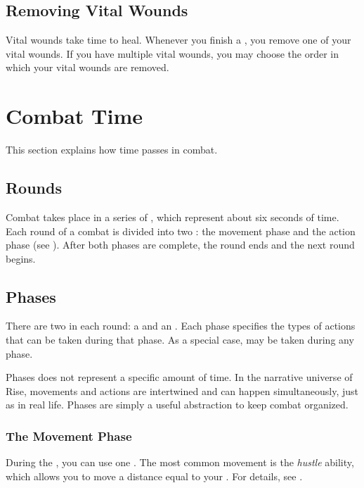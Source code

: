   \subsection{Removing Vital Wounds}\label{Removing Vital Wounds}
    Vital wounds take time to heal.
    Whenever you finish a , you remove one of your vital wounds.
    If you have multiple vital wounds, you may choose the order in which your vital wounds are removed.

\section{Combat Time}\label{Combat Time}
  This section explains how time passes in combat.

  \subsection{Rounds}\label{Rounds}

    Combat takes place in a series of , which represent about six seconds of time.
    Each round of a combat is divided into two : the movement phase and the action phase (see ).
    After both phases are complete, the round ends and the next round begins.

  \subsection{Phases}\label{Phases}

    There are two  in each round: a  and an .
    Each phase specifies the types of actions that can be taken during that phase.
    As a special case,  may be taken during any phase.

    Phases does not represent a specific amount of time.
    In the narrative universe of Rise, movements and actions are intertwined and can happen simultaneously, just as in real life.
    Phases are simply a useful abstraction to keep combat organized.

    \subsubsection{The Movement Phase}\label{The Movement Phase}
      During the , you can use one .
      The most common movement is the \textit{hustle} ability, which allows you to move a distance equal to your .
      For details, see .

